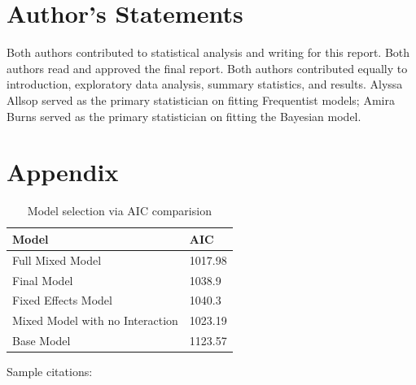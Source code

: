 \documentclass[12pt]{article}
\begin{document}
\section{Author's Statements}
\label{sec:auth}

Both authors contributed to statistical analysis and writing for this report. Both authors read and approved the final report. Both authors contributed equally to introduction, exploratory data analysis, summary statistics, and results. Alyssa Allsop served as the primary statistician on fitting Frequentist models; Amira Burns served as the primary statistician on fitting the Bayesian model.

\section{Appendix}
\label{sec:appendix}  
\begin{table}[!h]
\centering
\begin{tabu} to 
  \toprule
Model & AIC \\ 
  \midrule
Full Mixed Model & 1017.98 \\ 
  Final Model & 1038.9 \\ 
  Fixed Effects Model & 1040.3 \\ 
  Mixed Model with no Interaction & 1023.19 \\ 
  Base Model & 1123.57 \\ 
   \bottomrule
\end{tabu}
\caption{Model selection via AIC comparision} 
\end{table}

Sample citations:

\citep{R-lme4}\strut \\
\citep{R-rjags}
\citep{R-emmeans}



\end{document}
